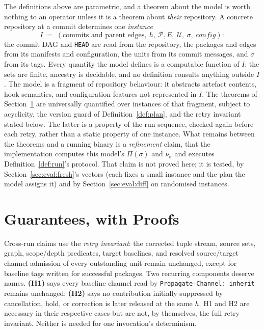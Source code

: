 \documentclass[10pt,conference]{IEEEtran}
\theoremstyle{definition}
\newcommand{\code}[1]{\texttt{#1}}
\begin{document}
The definitions above are parametric, and a theorem about the model
is worth nothing to an operator unless it is a theorem about
\emph{their} repository. A concrete repository at a commit determines
one \emph{instance}
\[
  I \;=\; (\text{commits and parent edges},\ h,\
           \mathcal{P}, E,\ \mathcal{U},\ \sigma,\ \mathit{config}):
\]
the commit DAG and \code{HEAD} are read from the repository, the
packages and edges from its manifests and configuration, the units
from its commit messages, and $\sigma$ from its tags. Every quantity
the model defines is a computable function of $I$: the sets are
finite, ancestry is decidable, and no definition consults anything
outside $I$. The model is a fragment of repository behaviour: it abstracts
artefact contents, hook semantics, and configuration features not represented
in $I$. The theorems of Section~\ref{sec:guarantees} are universally
quantified over instances of that fragment, subject to acyclicity, the
version guard of Definition~\ref{def:plan}, and the retry invariant stated
below. The latter is a property of the run sequence, checked again before
each retry, rather than a static property of one instance. What remains between the theorems and a running binary is a
\emph{refinement} claim, that the implementation computes this
model's $\Pi(\sigma)$ and $\nu_\sigma$ and executes
Definition~\ref{def:run}'s protocol. That claim is not proved here;
it is tested, by Section~\ref{sec:eval:fresh}'s vectors (each
fixes a small instance and the plan the model assigns it) and by
Section~\ref{sec:eval:diff} on randomised instances.

\section{Guarantees, with Proofs}
\label{sec:guarantees}

Cross-run claims use the \emph{retry invariant}: the corrected tuple
stream, source sets, graph, scope/depth predicates, target baselines, and
resolved source/target channel admission of every outstanding unit remain
unchanged, except for baseline tags written for successful packages.
Two recurring components deserve names. \textbf{(H1)} says every baseline
channel read by \code{Propagate-Channel: inherit} remains unchanged;
\textbf{(H2)} says no contribution initially suppressed by cancellation,
hold, or correction is later released at the same $h$. H1 and H2 are
necessary in their respective cases but are not, by themselves, the full
retry invariant. Neither is needed for one invocation's determinism.
\end{document}
